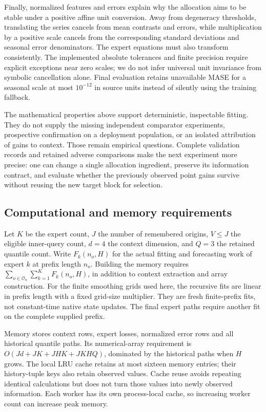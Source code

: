 Finally, normalized features and errors explain why the allocation aims to be stable under a positive affine unit conversion. Away from degeneracy thresholds, translating the series cancels from mean contrasts and errors, while multiplication by a positive scale cancels from the corresponding standard deviations and seasonal error denominators. The expert equations must also transform consistently. The implemented absolute tolerances and finite precision require explicit exceptions near zero scales; we do not infer universal unit invariance from symbolic cancellation alone. Final evaluation retains unavailable MASE for a seasonal scale at most $10^{-12}$ in source units instead of silently using the training fallback.

The mathematical properties above support deterministic, inspectable fitting. They do not supply the missing independent comparator experiments, prospective confirmation on a deployment population, or an isolated attribution of gains to context. Those remain empirical questions. Complete validation records and retained adverse comparisons make the next experiment more precise: one can change a single allocation ingredient, preserve its information contract, and evaluate whether the previously observed point gains survive without reusing the new target block for selection.

\subsection{Computational and memory requirements}
Let $K$ be the expert count, $J$ the number of remembered origins, $V\le J$ the eligible inner-query count, $d=4$ the context dimension, and $Q=3$ the retained quantile count. Write $F_k(n_o,H)$ for the actual fitting and forecasting work of expert $k$ at prefix length $n_o$. Building the memory requires $\sum_{o\in\mathcal O_n}\sum_{k=1}^K F_k(n_o,H)$, in addition to context extraction and array construction. For the finite smoothing grids used here, the recursive fits are linear in prefix length with a fixed grid-size multiplier. They are fresh finite-prefix fits, not constant-time native state updates. The final expert paths require another fit on the complete supplied prefix.

Memory stores context rows, expert losses, normalized error rows and all historical quantile paths. Its numerical-array requirement is $O(Jd+JK+JHK+JKHQ)$, dominated by the historical paths when $H$ grows. The local LRU cache retains at most sixteen memory entries; their history-tuple keys also retain observed values. Cache reuse avoids repeating identical calculations but does not turn those values into newly observed information. Each worker has its own process-local cache, so increasing worker count can increase peak memory.

